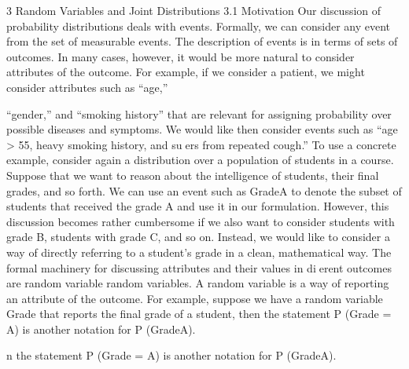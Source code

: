 3 Random Variables and Joint Distributions
3.1 Motivation
Our discussion of probability distributions deals with events. Formally, we can consider any event from the set of measurable events. The description of events is in terms of sets of outcomes. In many cases, however, it would be more natural to consider attributes of the outcome. For example, if we consider a patient, we might consider attributes such as “age,”

“gender,” and “smoking history” that are relevant for assigning probability over possible diseases and symptoms. We would like then consider events such as “age > 55, heavy smoking history, and suers from repeated cough.” To use a concrete example, consider again a distribution over a population of students in a course. Suppose that we want to reason about the intelligence of students, their final grades, and so forth. We can use an event such as GradeA to denote the subset of students that received the grade A and use it in our formulation. However, this discussion becomes rather cumbersome if we also want to consider students with grade B, students with grade C, and so on. Instead, we would like to consider a way of directly referring to a student’s grade in a clean, mathematical way. The formal machinery for discussing attributes and their values in dierent outcomes are random variable random variables. A random variable is a way of reporting an attribute of the outcome. For example, suppose we have a random variable Grade that reports the final grade of a student, then the statement P (Grade = A) is another notation for P (GradeA).

n the statement P (Grade = A) is another notation for P (GradeA).

